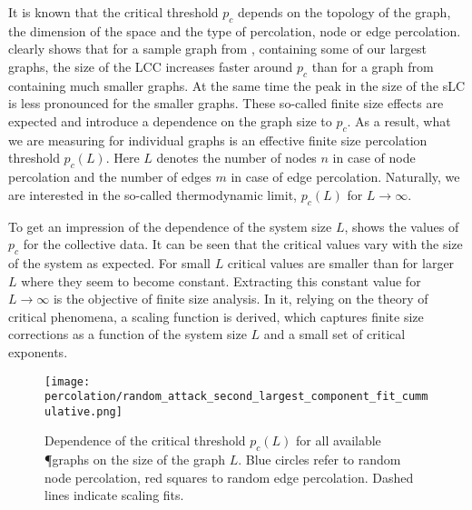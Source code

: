 		It is known that the critical threshold $p_c$ depends on the topology of the graph, the dimension of the space and the type of percolation, \eg node or edge percolation.  clearly shows that for a sample graph from , containing some of our largest graphs, the size of the LCC increases faster around $p_c$ than for a graph from  containing much smaller graphs. At the same time the peak in the size of the sLC is less pronounced for the smaller graphs. These so-called finite size effects are expected and introduce a dependence on the graph size to $p_c$. As a result, what we are measuring for individual graphs is an effective finite size percolation threshold $p_c(L)$. Here $L$ denotes the number of nodes $n$ in case of node percolation and the number of edges $m$ in case of edge percolation. Naturally, we are interested in the so-called thermodynamic limit, \ie $p_c(L)$ for $L \to \infty$. 

		To get an impression of the dependence of the system size $L$,  shows the values of $p_c$ for the collective data. It can be seen that the critical values vary with the size of the system as expected. For small $L$ critical values are smaller than for larger $L$ where they seem to become constant. Extracting this constant value for $L \to \infty$ is the objective of finite size analysis. In it, relying on the theory of critical phenomena, a scaling function is derived, which captures finite size corrections as a function of the system size $L$ and a small set of critical exponents. 
		
		\begin{figure}[!htbp]
			\centering
				\texttt{[image: percolation/random\_attack\_second\_largest\_component\_fit\_cummulative.png]}
			\caption[Critical percolation thresholds]{Dependence of the critical threshold $p_c(L)$ for all available \P graphs on the size of the graph $L$. Blue circles refer to random node percolation, red squares to random edge percolation. Dashed lines indicate scaling fits.}
			\label{fig:percolation_scaling}
		\end{figure}

